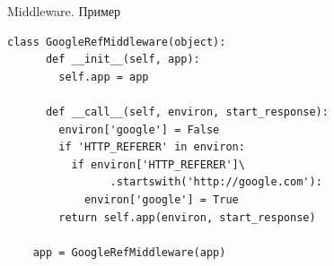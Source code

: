 \begin{frame}[fragile]{Middleware. Пример}
    \begin{lstlisting}[style=python]
    class GoogleRefMiddleware(object):
      def __init__(self, app):
        self.app = app

      def __call__(self, environ, start_response):
        environ['google'] = False
        if 'HTTP_REFERER' in environ:
          if environ['HTTP_REFERER']\
                .startswith('http://google.com'):
            environ['google'] = True
        return self.app(environ, start_response)

    app = GoogleRefMiddleware(app)
    \end{lstlisting}
\end{frame}


